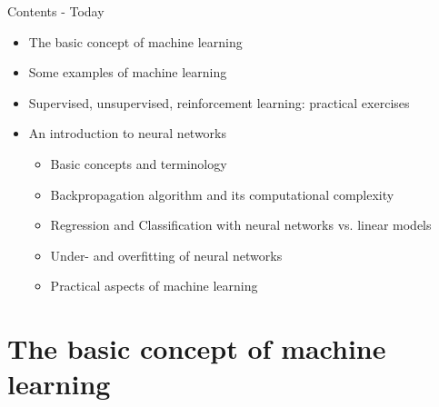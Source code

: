\documentclass[color=usenames,dvipsnames]{beamer}
\begin{document}
\begin{frame}{Contents - Today} 

\begin{itemize}
	\item The basic concept of machine learning
	\item Some examples of machine learning
	\item Supervised, unsupervised, reinforcement learning: practical exercises
	
	\item An introduction to neural networks 

	\begin{itemize}
		\item Basic concepts and terminology
		\item Backpropagation algorithm and its computational complexity
		\item Regression and Classification with neural networks vs. linear models
		\item Under- and overfitting of neural networks
		\item Practical aspects of machine learning
	\end{itemize}

\end{itemize}





\end{frame}

\section{The basic concept of machine learning}
\end{document}

